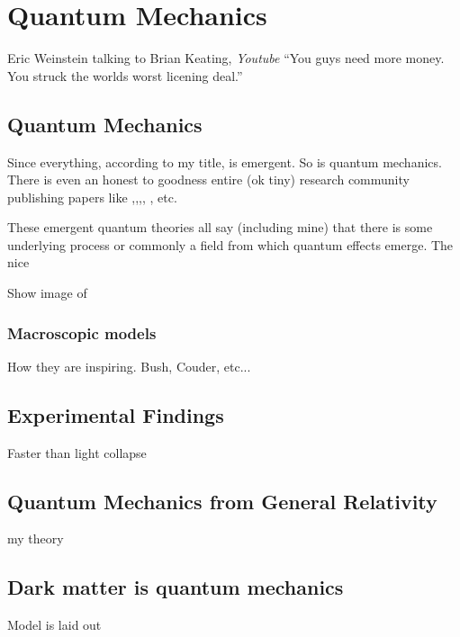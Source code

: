 \documentclass[../rzero]{subfiles}
\begin{document}
\chapter{Quantum Mechanics}\label{quantumMechanicsChapter}

\begin{chapquote}{Eric Weinstein talking to Brian Keating, \textit{Youtube\cite{drbriankeatingEricWeinsteinTheoretical2020}}}
``You guys need more money. You struck the worlds worst licening deal.''
\end{chapquote}


\section{Quantum Mechanics}
Since everything, according to my title, is emergent. So is quantum mechanics. There is even an honest to goodness entire (ok tiny) research community publishing papers like \cite{tHooft2007},\cite{Grossing2012},\cite{acostaEMERGENTQUANTUMMECHANICS2012},\cite{Walleczek2019}, \cite{Durey2018}, etc. 

These emergent quantum theories all say (including mine) that there is some underlying process or commonly a field from which quantum effects emerge. The nice

Show image of 

\subsection{Macroscopic models}
How they are inspiring. Bush, Couder, etc...

\section{Experimental Findings}
Faster than light collapse



\section{Quantum Mechanics from General Relativity}
my theory


\section{Dark matter is quantum mechanics}
	Model is laid out 
\end{document}
